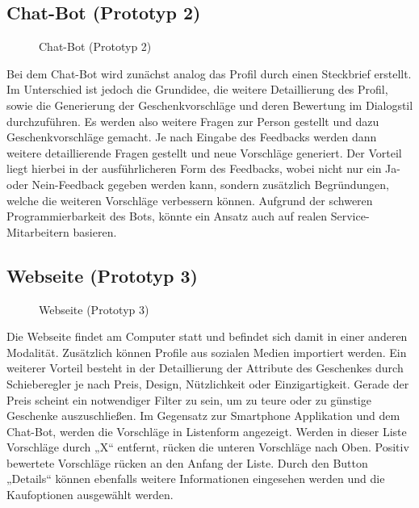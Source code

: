 \documentclass[12pt,ngerman, fleqn]{book} %
\begin{document}
\subsection{Chat-Bot (Prototyp 2)}
\begin{figure}[ht]
    \centering
    \caption{Chat-Bot (Prototyp 2)}
    \label{fig:proto2}
\end{figure}

Bei dem Chat-Bot wird zunächst analog das Profil durch einen Steckbrief erstellt. Im Unterschied ist jedoch die Grundidee, die weitere Detaillierung des Profil, sowie die Generierung der Geschenkvorschläge und deren Bewertung im Dialogstil durchzuführen. Es werden also weitere Fragen zur Person gestellt und dazu Geschenkvorschläge gemacht. Je nach Eingabe des Feedbacks werden dann weitere detaillierende Fragen gestellt und neue Vorschläge generiert. Der Vorteil liegt hierbei in der ausführlicheren Form des Feedbacks, wobei nicht nur ein Ja- oder Nein-Feedback gegeben werden kann, sondern zusätzlich Begründungen, welche die weiteren Vorschläge verbessern können. Aufgrund der schweren Programmierbarkeit des Bots, könnte ein Ansatz auch auf realen Service-Mitarbeitern basieren.

\subsection{Webseite (Prototyp 3)}
\begin{figure}[ht]
    \centering
    \caption{Webseite (Prototyp 3)}
    \label{fig:proto3}
\end{figure}

Die Webseite findet am Computer statt und befindet sich damit in einer anderen Modalität. Zusätzlich können Profile aus sozialen Medien importiert werden. Ein weiterer Vorteil besteht in der Detaillierung der Attribute des Geschenkes durch Schieberegler je nach Preis, Design, Nützlichkeit oder Einzigartigkeit. Gerade der Preis scheint ein notwendiger Filter zu sein, um zu teure oder zu günstige Geschenke auszuschließen. Im Gegensatz zur Smartphone Applikation und dem Chat-Bot, werden die Vorschläge in Listenform angezeigt. Werden in dieser Liste Vorschläge durch „X“ entfernt, rücken die unteren Vorschläge nach Oben. Positiv bewertete Vorschläge rücken an den Anfang der Liste. Durch den Button „Details“ können ebenfalls weitere Informationen eingesehen werden und die Kaufoptionen ausgewählt werden. 
\end{document}
